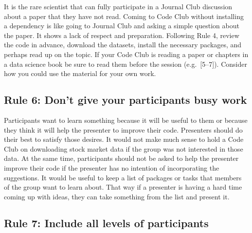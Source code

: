 \documentclass[
  11pt,
]{article}
\begin{document}
It is the rare scientist that can fully participate in a Journal Club
discussion about a paper that they have not read. Coming to Code Club
without installing a dependency is like going to Journal Club and asking
a simple question about the paper. It shows a lack of respect and
preparation. Following Rule 4, review the code in advance, download the
datasets, install the necessary packages, and perhaps read up on the
topic. If your Code Club is reading a paper or chapters in a data
science book be sure to read them before the session (e.g.~{[}5--7{]}).
Consider how you could use the material for your own work.

\hypertarget{rule-6-dont-give-your-participants-busy-work}{%
\subsection{Rule 6: Don't give your participants busy
work}\label{rule-6-dont-give-your-participants-busy-work}}

Participants want to learn something because it will be useful to them
or because they think it will help the presenter to improve their code.
Presenters should do their best to satisfy those desires. It would not
make much sense to hold a Code Club on downloading stock market data if
the group was not interested in those data. At the same time,
participants should not be asked to help the presenter improve their
code if the presenter has no intention of incorporating the suggestions.
It would be useful to keep a list of packages or tasks that members of
the group want to learn about. That way if a presenter is having a hard
time coming up with ideas, they can take something from the list and
present it.

\hypertarget{rule-7-include-all-levels-of-participants}{%
\subsection{Rule 7: Include all levels of
participants}\label{rule-7-include-all-levels-of-participants}}
\end{document}
